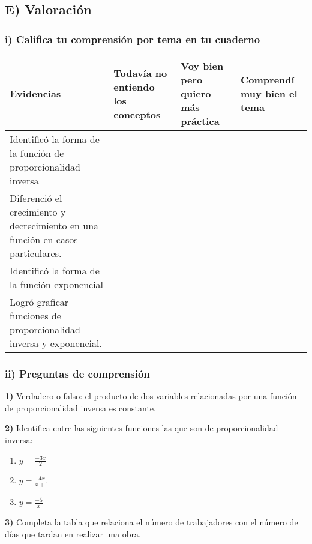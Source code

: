 \documentclass[12pt,a4paper]{article}
\begin{document}
\vspace{5mm}


\subsection*{E) Valoración}

\subsubsection*{i) Califica tu comprensión por tema en tu cuaderno}

\begin{center}
\small
\begin{tabular}{|p{3.5cm}|p{3cm}|p{3cm}|p{3cm}|}
\hline
\textbf{Evidencias} & \textbf{Todavía no entiendo los conceptos} & \textbf{Voy bien pero quiero más práctica} & \textbf{Comprendí muy bien el tema} \\
\hline
Identificó la forma de la función de proporcionalidad inversa & & & \\
\hline
Diferenció el crecimiento y decrecimiento en una función en casos particulares. & & & \\
\hline
Identificó la forma de la función exponencial & & & \\
\hline
Logró graficar funciones de proporcionalidad inversa y exponencial. & & & \\
\hline
\end{tabular}
\end{center}

\subsubsection*{ii) Preguntas de comprensión}

\textbf{1)} Verdadero o falso: el producto de dos variables relacionadas por una función de proporcionalidad inversa es constante.

\textbf{2)} Identifica entre las siguientes funciones las que son de proporcionalidad inversa:

\begin{enumerate}[label=\alph*)]
\item $y = \frac{-3x}{2}$
\item $y = \frac{4x}{x + 1}$
\item $y = \frac{-5}{x}$
\end{enumerate}

\textbf{3)} Completa la tabla que relaciona el número de trabajadores con el número de días que tardan en realizar una obra.
\end{document}
